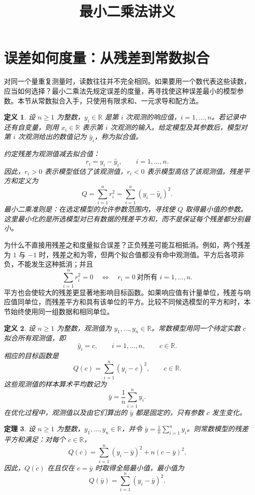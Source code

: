 \documentclass[UTF8,fontset=fandol,11pt]{ctexart}
\title{最小二乘法讲义}
\date{}
\newtheorem{definition}{定义}[section]
\newtheorem{theorem}[definition]{定理}
\begin{document}
\maketitle
\section{误差如何度量：从残差到常数拟合}\label{sec:S01}
对同一个量重复测量时，读数往往并不完全相同。如果要用一个数代表这些读数，应当如何选择？最小二乘法先规定误差的度量，再寻找使这种误差最小的模型参数。本节从常数拟合入手，只使用有限求和、一元求导和配方法。\par
\begin{definition}
设 $n\geq 1$ 为整数，$y_i\in\mathbb{R}$ 是第 $i$ 次观测的响应值，$i=1,\ldots,n$。若记录中还有自变量，则用 $x_i\in\mathbb{R}$ 表示第 $i$ 次观测的输入。给定模型及其参数后，模型对第 $i$ 次观测给出的数值记为 $\hat{y}_i$，称为拟合值。

约定残差为观测值减去拟合值：
\[
r_i=y_i-\hat{y}_i,\qquad i=1,\ldots,n.
\]
因此，$r_i>0$ 表示模型低估了该观测值，$r_i<0$ 表示模型高估了该观测值。残差平方和定义为
\[
Q=\sum_{i=1}^{n}r_i^2=\sum_{i=1}^{n}(y_i-\hat{y}_i)^2.
\]
最小二乘准则是：在选定模型的允许参数范围内，寻找使 $Q$ 取得最小值的参数。这里最小化的是所选模型对已有数据的残差平方和，而不是保证每个残差都分别最小。
\end{definition}
为什么不直接用残差之和度量拟合误差？正负残差可能互相抵消。例如，两个残差为 $1$ 与 $-1$ 时，残差之和为零，但两个拟合值都没有命中观测值。平方后各项非负，不能发生这种抵消；并且
\[
\sum_{i=1}^{n}r_i^2=0\quad\Longleftrightarrow\quad r_i=0\ \text{对所有 }i=1,\ldots,n.
\]
平方也会使较大的残差更显著地影响目标函数。如果响应值有计量单位，残差与响应值同单位，而残差平方和具有该单位的平方。比较不同候选模型的平方和时，本节始终使用同一组数据和相同单位。\par
\begin{definition}
设 $n\geq1$ 为整数，观测值为 $y_1,\ldots,y_n\in\mathbb{R}$。常数模型用同一个待定实数 $c$ 拟合所有观测值，即
\[
\hat{y}_i=c,\qquad i=1,\ldots,n,\qquad c\in\mathbb{R}.
\]
相应的目标函数是
\[
Q(c)=\sum_{i=1}^{n}(y_i-c)^2,\qquad c\in\mathbb{R}.
\]
这些观测值的样本算术平均数记为
\[
\bar{y}=\frac{1}{n}\sum_{i=1}^{n}y_i.
\]
在优化过程中，观测值以及由它们算出的 $\bar{y}$ 都是固定的，只有参数 $c$ 发生变化。
\end{definition}
\begin{theorem}
设 $n\geq1$ 为整数，$y_1,\ldots,y_n\in\mathbb{R}$，并令 $\bar{y}=\frac{1}{n}\sum_{i=1}^{n}y_i$。则常数模型的残差平方和满足：对每个 $c\in\mathbb{R}$，
\[
Q(c)=\sum_{i=1}^{n}(y_i-\bar{y})^2+n(c-\bar{y})^2.
\]
因此，$Q(c)$ 在且仅在 $c=\bar{y}$ 时取得全局最小值，最小值为
\[
Q(\bar{y})=\sum_{i=1}^{n}(y_i-\bar{y})^2.
\]
\end{theorem}
\end{document}
